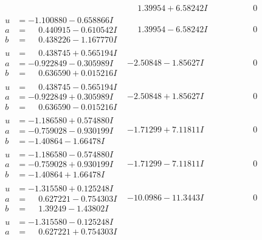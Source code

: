 \documentclass[1p]{elsarticle_modified}
\theoremstyle{definition}
\begin{document}
$$\begin{array}{c|c|c}
 & \phantom{-}1.39954 + 6.58242 I & \phantom{-0.000000 } 0 \\ \hline\begin{aligned}
u &= -1.100880 - 0.658866 I \\
a &= \phantom{-}0.440915 - 0.610542 I \\
b &= \phantom{-}0.438226 - 1.167770 I\end{aligned}
 & \phantom{-}1.39954 - 6.58242 I & \phantom{-0.000000 } 0 \\ \hline\begin{aligned}
u &= \phantom{-}0.438745 + 0.565194 I \\
a &= -0.922849 - 0.305989 I \\
b &= \phantom{-}0.636590 + 0.015216 I\end{aligned}
 & -2.50848 - 1.85627 I & \phantom{-0.000000 } 0 \\ \hline\begin{aligned}
u &= \phantom{-}0.438745 - 0.565194 I \\
a &= -0.922849 + 0.305989 I \\
b &= \phantom{-}0.636590 - 0.015216 I\end{aligned}
 & -2.50848 + 1.85627 I & \phantom{-0.000000 } 0 \\ \hline\begin{aligned}
u &= -1.186580 + 0.574880 I \\
a &= -0.759028 - 0.930199 I \\
b &= -1.40864 - 1.66478 I\end{aligned}
 & -1.71299 + 7.11811 I & \phantom{-0.000000 } 0 \\ \hline\begin{aligned}
u &= -1.186580 - 0.574880 I \\
a &= -0.759028 + 0.930199 I \\
b &= -1.40864 + 1.66478 I\end{aligned}
 & -1.71299 - 7.11811 I & \phantom{-0.000000 } 0 \\ \hline\begin{aligned}
u &= -1.315580 + 0.125248 I \\
a &= \phantom{-}0.627221 - 0.754303 I \\
b &= \phantom{-}1.39249 - 1.43802 I\end{aligned}
 & -10.0986 - 11.3443 I & \phantom{-0.000000 } 0 \\ \hline\begin{aligned}
u &= -1.315580 - 0.125248 I \\
a &= \phantom{-}0.627221 + 0.754303 I \\

\end{aligned}
\end{array}$$
\end{document}
